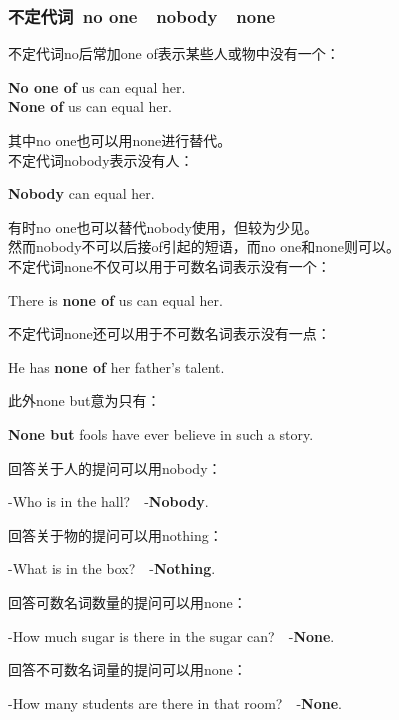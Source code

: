 \documentclass[UTF8]{ctexart}
\newcommand{\littf}[1]{{\hspace{3pt}\ttfamily #1}}
\begin{document}
\newpage

\subsubsection{不定代词~\littf{no one}~~\littf{nobody}~~\littf{none}}
    不定代词\littf{no}后常加\littf{one of}表示某些人或物中没有一个：
    \begin{center}
        \large\ttfamily
        \textbf{No one of} us can equal her.\\[3mm]
        \textbf{None of} us can equal her.\\[6mm]
    \end{center}
    其中\littf{no one}也可以用\littf{none}进行替代。\\[7mm]
    不定代词\littf{nobody}表示没有人：
    \begin{center}
        \large\ttfamily
        \textbf{Nobody} can equal her.\\[6mm]
    \end{center}
    有时\littf{no one}也可以替代\littf{nobody}使用，但较为少见。\\[3mm]
    然而\littf{nobody}不可以后接\littf{of}引起的短语，而\littf{no one}和\littf{none}则可以。\\[7mm]
    不定代词\littf{none}不仅可以用于可数名词表示没有一个：
    \begin{center}
        \large\ttfamily
        There is \textbf{none of} us can equal her.\\[6mm]
    \end{center}
    不定代词\littf{none}还可以用于不可数名词表示没有一点：
    \begin{center}
        \large\ttfamily
        He has \textbf{none of} her father's talent.\\[6mm]
    \end{center}
    此外\littf{none but}意为只有：
    \begin{center}
        \large\ttfamily
        \textbf{None but} fools have ever believe in such a story.\\[6mm]
    \end{center}
    回答关于人的提问可以用\littf{nobody}：
    \begin{center}
        \large\ttfamily
        -Who is in the hall?~~-\textbf{Nobody}.\\[6mm]
    \end{center}
    回答关于物的提问可以用\littf{nothing}：
    \begin{center}
        \large\ttfamily
        -What is in the box?~~-\textbf{Nothing}.\\[6mm]
    \end{center}
    回答可数名词数量的提问可以用\littf{none}：
    \begin{center}
        \large\ttfamily
        -How much sugar is there in the sugar can?~~-\textbf{None}.\\[6mm]
    \end{center}
    回答不可数名词量的提问可以用\littf{none}：
    \begin{center}
        \large\ttfamily
        -How many students are there in that room?~~-\textbf{None}.
    \end{center}
\end{document}
